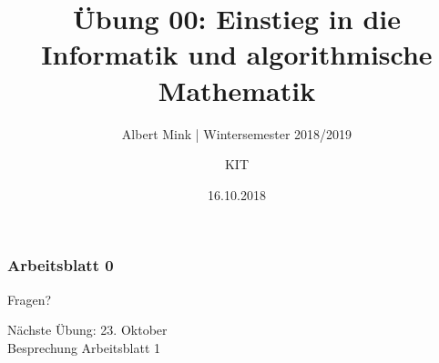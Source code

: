 \documentclass[c,18pt]{beamer}
\date{16.10.2018}
\title[Übung 00: Einstieg in die Informatik und algorithmische]
  {Übung 00: Einstieg in die Informatik und algorithmische \\ Mathematik}
\subtitle{Albert Mink | Wintersemester 2018/2019}
\author[Albert Mink, ]{KIT}
\institute[Institut für Angewandte und Numerische Mathematik (IANM)]{Institut für Angewandte und Numerische Mathematik}
\begin{document}
\begin{frame}
  \maketitle
\end{frame}

\begin{frame}
  \frametitle{Arbeitsblatt 0}%
\tableofcontents[hideallsubsections]
\end{frame}

\def\kap{1}%

\def\kap{2}%

\def\kap{3}%

\def\kap{4}%


\def\kap{5}%

\def\kap{6}%




\begin{frame}
\centering
\Huge\textcolor{KITgreen}{Fragen?}
\vspace{2cm}

{\LARGE
N\"achste \"Ubung: 23. Oktober\\
Besprechung Arbeitsblatt 1
}
\end{frame}


\end{document}
